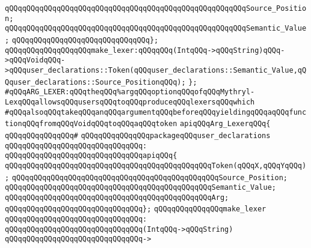 \verb|qQQqqQQqqQQqqQQqqQQqqQQqqQQqqQQqqQQqqQQqqQQqqQQqqQQqqQQqSource_Position;|\newline
\verb|qQQqqQQqqQQqqQQqqQQqqQQqqQQqqQQqqQQqqQQqqQQqqQQqqQQqqQQqSemantic_Value;|\newline
\verb|qQQqqQQqqQQqqQQqqQQqqQQqqQQqqQQq};|\newline
\newline
\verb|qQQqqQQqqQQqqQQqqQQqmake_lexer:qQQqqQQq(IntqQQq->qQQqString)qQQq->qQQqVoidqQQq->qQQquser_declarations::Token(qQQquser_declarations::Semantic_Value,qQQquser_declarations::Source_PositionqQQq);|\newline
\verb|};|\newline
\newline
\verb|#qQQqARG_LEXER:qQQqtheqQQq%argqQQqoptionqQQqofqQQqMythryl-LexqQQqallowsqQQqusersqQQqtoqQQqproduceqQQqlexersqQQqwhich|\newline
\verb|#qQQqalsoqQQqtakeqQQqanqQQqargumentqQQqbeforeqQQqyieldingqQQqaqQQqfunctionqQQqfromqQQqVoidqQQqtoqQQqaqQQqtoken|\newline
\newline
\newline
\verb|apiqQQqArg_LexerqQQq{|\newline
\verb|qQQqqQQqqQQqqQQq#|\newline
\verb|qQQqqQQqqQQqqQQqpackageqQQquser_declarations|\newline
\verb|qQQqqQQqqQQqqQQqqQQqqQQqqQQqqQQq:|\newline
\verb|qQQqqQQqqQQqqQQqqQQqqQQqqQQqqQQqapiqQQq{|\newline
\verb|qQQqqQQqqQQqqQQqqQQqqQQqqQQqqQQqqQQqqQQqqQQqqQQqToken(qQQqX,qQQqYqQQq);|\newline
\verb|qQQqqQQqqQQqqQQqqQQqqQQqqQQqqQQqqQQqqQQqqQQqqQQqSource_Position;|\newline
\verb|qQQqqQQqqQQqqQQqqQQqqQQqqQQqqQQqqQQqqQQqqQQqqQQqSemantic_Value;|\newline
\verb|qQQqqQQqqQQqqQQqqQQqqQQqqQQqqQQqqQQqqQQqqQQqqQQqArg;|\newline
\verb|qQQqqQQqqQQqqQQqqQQqqQQqqQQqqQQq};|\newline
\newline
\verb|qQQqqQQqqQQqqQQqmake_lexer|\newline
\verb|qQQqqQQqqQQqqQQqqQQqqQQqqQQqqQQq:|\newline
\verb|qQQqqQQqqQQqqQQqqQQqqQQqqQQqqQQq(IntqQQq->qQQqString)|\newline
\verb|qQQqqQQqqQQqqQQqqQQqqQQqqQQqqQQq->|\newline
